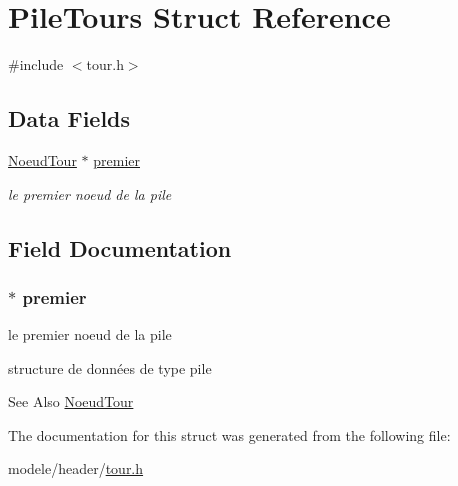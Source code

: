 \hypertarget{struct_pile_tours}{\section{Pile\-Tours Struct Reference}
\label{struct_pile_tours}
}


{\ttfamily \#include $<$tour.\-h$>$}

\subsection*{Data Fields}
\begin{DoxyCompactItemize}
\item 
\hyperlink{struct_noeud_tour}{Noeud\-Tour} $\ast$ \hyperlink{struct_pile_tours_adad046264049a33d160306cd35e0b2db}{premier}
\begin{DoxyCompactList}\small\item\em le premier noeud de la pile \end{DoxyCompactList}\end{DoxyCompactItemize}


\subsection{Field Documentation}
\hypertarget{struct_pile_tours_adad046264049a33d160306cd35e0b2db}{
\subsubsection[{premier}]{$\ast$ premier}}\label{struct_pile_tours_adad046264049a33d160306cd35e0b2db}


le premier noeud de la pile 

structure de données de type pile \begin{DoxySeeAlso}{See Also}
\hyperlink{struct_noeud_tour}{Noeud\-Tour} 
\end{DoxySeeAlso}


The documentation for this struct was generated from the following file\-:\begin{DoxyCompactItemize}
\item 
modele/header/\hyperlink{tour_8h}{tour.\-h}\end{DoxyCompactItemize}
